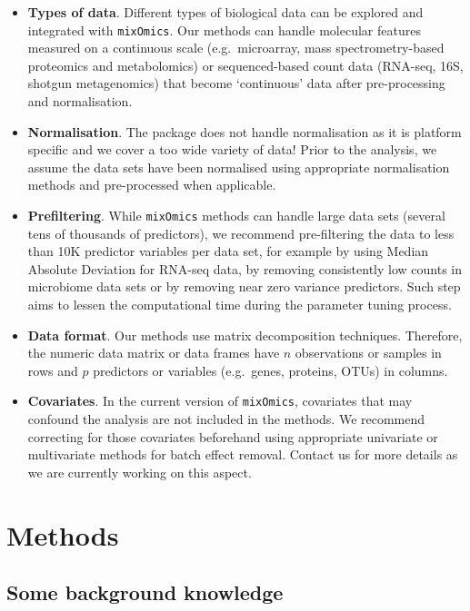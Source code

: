 \documentclass[]{book}
\begin{document}
\begin{itemize}
\item
  \textbf{Types of data}. Different types of biological data can be explored and integrated with \texttt{mixOmics}. Our methods can handle molecular features measured on a continuous scale (e.g.~microarray, mass spectrometry-based proteomics and metabolomics) or sequenced-based count data (RNA-seq, 16S, shotgun metagenomics) that become `continuous' data after pre-processing and normalisation.
\item
  \textbf{Normalisation}. The package does not handle normalisation as it is platform specific and we cover a too wide variety of data! Prior to the analysis, we assume the data sets have been normalised using appropriate normalisation methods and pre-processed when applicable.
\item
  \textbf{Prefiltering}. While \texttt{mixOmics} methods can handle large data sets (several tens of thousands of predictors), we recommend pre-filtering the data to less than 10K predictor variables per data set, for example by using Median Absolute Deviation \citep{Ten16} for RNA-seq data, by removing consistently low counts in microbiome data sets \citep{Lec16} or by removing near zero variance predictors. Such step aims to lessen the computational time during the parameter tuning process.
\item
  \textbf{Data format}.
  Our methods use matrix decomposition techniques. Therefore, the numeric data matrix or data frames have \(n\) observations or samples in rows and \(p\) predictors or variables (e.g.~genes, proteins, OTUs) in columns.
\item
  \textbf{Covariates}. In the current version of \texttt{mixOmics}, covariates that may confound the analysis are not included in the methods. We recommend correcting for those covariates beforehand using appropriate univariate or multivariate methods for batch effect removal. Contact us for more details as we are currently working on this aspect.
\end{itemize}

\hypertarget{methods}{%
\section{Methods}\label{methods}}

\hypertarget{intro:background}{%
\subsection{Some background knowledge}\label{intro:background}}
\end{document}

